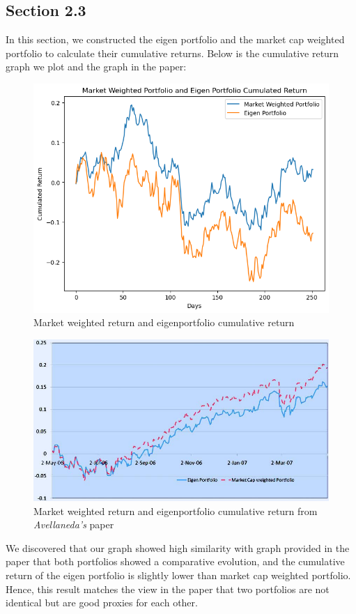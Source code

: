 \documentclass[12pt, letterpaper, twoside]{article}
\begin{document}
    \subsection{Section 2.3}
    In this section, we constructed the eigen portfolio 
    and the market cap weighted portfolio to calculate 
    their cumulative returns. 
    Below is the cumulative return graph we plot 
    and the graph in the paper:
    \begin{figure}[h]
        \centering
        \includegraphics[width=0.8\linewidth]{eigenportfolio.png}
        \caption{Market weighted return and 
        eigenportfolio cumulative return}
    \end{figure}

    \begin{figure}[h]
        \centering
        \includegraphics[width=0.8\linewidth]{paper3.jpg}
        \caption{Market weighted return and 
        eigenportfolio cumulative return from \textit{Avellaneda's} paper}
    \end{figure}

    We discovered that our graph showed high similarity 
    with graph provided in the paper that both portfolios 
    showed a comparative evolution, and the cumulative 
    return of the eigen portfolio is slightly lower than 
    market cap weighted portfolio. Hence, this result 
    matches the view in the paper that two portfolios 
    are not identical but are good proxies for each other.
    
\end{document}
